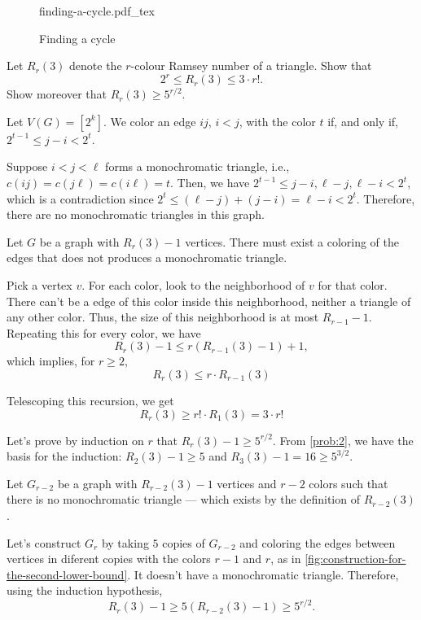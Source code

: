 \documentclass[10pt, a4paper]{article}
\newcommand{\incfig}[2][1]{%
    \def\svgwidth{#1\columnwidth}
    {#2.pdf_tex}
}
\begin{document}
\begin{figure}[ht]
    \centering
	\incfig[0.5]{finding-a-cycle}
    \caption{Finding a cycle}
    \label{fig:finding-a-cycle}
\end{figure}

\newpage
\begin{prob}
	Let $R_r(3)$ denote the $r$-colour Ramsey number of a triangle. Show that \[
		2^r \leqslant R_r(3) \leqslant 3 \cdot r!.
	\]
	Show moreover that $R_r(3) \geqslant 5^{r/2}$.
\end{prob}

\begin{sol}
	Let $V(G) = [2^k]$. We color an edge $ij$, $i < j$, with the color $t$ if, and only if, $2^{t-1} \leqslant j - i < 2^t$.

	Suppose $i < j < \ell$ forms a monochromatic triangle, i.e., $c(ij) = c(j\ell) = c(i\ell) = t$. Then, we have $2^{t-1} \leqslant j- i, \ell - j, \ell - i < 2^t$, which is a contradiction since $2^t \leqslant (\ell - j) + (j - i) = \ell - i < 2^t$. Therefore, there are no monochromatic triangles in this graph.
\end{sol}

\begin{sol}
	Let $G$ be a graph with $R_r(3) - 1$ vertices. There must exist a coloring of the edges that does not produces a monochromatic triangle.
	
	Pick a vertex $v$. For each color, look to the neighborhood of $v$ for that color. There can't be a edge of this color inside this neighborhood, neither a triangle of any other color. Thus, the size of this neighborhood is at most $R_{r-1}-1$. Repeating this for every color, we have  \[
		R_r(3) - 1 \leqslant r(R_{r-1}(3) - 1) + 1,
	\]
	which implies, for $r \geqslant 2$, \[
		R_r(3) \leqslant r \cdot R_{r-1}(3)
	\]

	Telescoping this recursion, we get \[
		R_r(3) \geqslant r! \cdot R_{1}(3) = 3\cdot r!
	\]
\end{sol}

\begin{sol}Let's prove by induction on $r$ that $R_r(3) - 1\geqslant 5^{r/2}$.
	From \cref{prob:2}, we have the basis for the induction: $R_2(3) - 1 \geqslant 5$ and $R_3(3) - 1 = 16 \geqslant 5^{3/2}$.

	Let $G_{r-2}$ be a graph with $R_{r-2}(3) - 1$ vertices and $r-2$ colors such that there is no monochromatic triangle --- which exists by the definition of $R_{r-2}(3)$.

	Let's construct $G_{r}$ by taking $5$ copies of $G_{r-2}$ and coloring the edges between vertices in diferent copies with the colors $r-1$ and $r$, as in \cref{fig:construction-for-the-second-lower-bound}. It doesn't have a monochromatic triangle. Therefore, using the induction hypothesis, \[
		R_{r}(3) - 1 \geqslant 5(R_{r-2}(3) - 1) \geqslant 5^{r/2}.
	\]
\end{sol}
\end{document}
